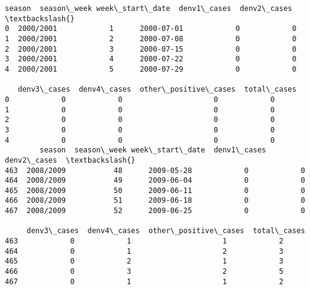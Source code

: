 \documentclass[11pt]{article}
\begin{document}
    \begin{Verbatim}[commandchars=\\\{\}]
      season  season\_week week\_start\_date  denv1\_cases  denv2\_cases  \textbackslash{}
0  2000/2001            1      2000-07-01            0            0   
1  2000/2001            2      2000-07-08            0            0   
2  2000/2001            3      2000-07-15            0            0   
3  2000/2001            4      2000-07-22            0            0   
4  2000/2001            5      2000-07-29            0            0   

   denv3\_cases  denv4\_cases  other\_positive\_cases  total\_cases  
0            0            0                     0            0  
1            0            0                     0            0  
2            0            0                     0            0  
3            0            0                     0            0  
4            0            0                     0            0  
        season  season\_week week\_start\_date  denv1\_cases  denv2\_cases  \textbackslash{}
463  2008/2009           48      2009-05-28            0            0   
464  2008/2009           49      2009-06-04            0            0   
465  2008/2009           50      2009-06-11            0            0   
466  2008/2009           51      2009-06-18            0            0   
467  2008/2009           52      2009-06-25            0            0   

     denv3\_cases  denv4\_cases  other\_positive\_cases  total\_cases  
463            0            1                     1            2  
464            0            1                     2            3  
465            0            2                     1            3  
466            0            3                     2            5  
467            0            1                     1            2  

    \end{Verbatim}
\end{document}

